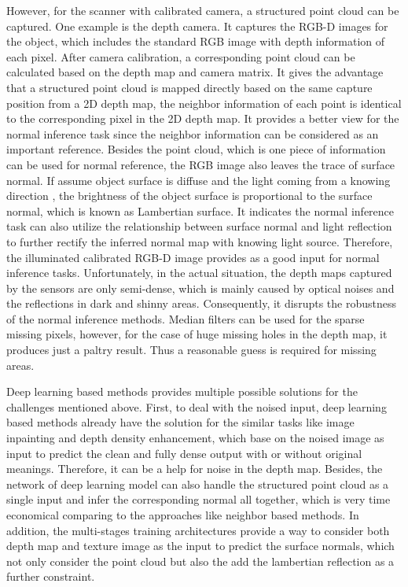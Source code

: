 However, for the scanner with calibrated camera, a structured point cloud can be captured. One example is the depth camera. It captures the RGB-D images for the object, which includes the standard RGB image with depth information of each pixel. After camera calibration, a corresponding point cloud can be calculated based on the depth map and camera matrix. It gives the advantage that a structured point cloud is mapped directly based on the same capture position from a 2D depth map, the neighbor information of each point is identical to the corresponding pixel in the 2D depth map. It provides a better view for the normal inference task since the neighbor information can be considered as an important reference.
Besides the point cloud, which is one piece of information can be used for normal reference, the RGB image also leaves the trace of surface normal. If assume object surface is diffuse and the light coming from a knowing direction , the brightness of the object surface is proportional to the surface normal, which is known as Lambertian surface. It indicates the normal inference task can also utilize the relationship between surface normal and light reflection to further rectify the inferred normal map with knowing light source. Therefore, the illuminated calibrated RGB-D image provides as a good input for normal inference tasks.
Unfortunately, in the actual situation, the depth maps captured by the sensors are only semi-dense, which is mainly caused by optical noises and the reflections in dark and shinny areas. Consequently, it disrupts the robustness of the normal inference methods. Median filters can be used for the sparse missing pixels, however, for the case of huge missing holes in the depth map, it produces just a paltry result. Thus a reasonable guess is required for missing areas.

Deep learning based methods provides multiple possible solutions for the challenges mentioned above. First, to deal with the noised input, deep learning based methods already have the solution for the similar tasks like image inpainting and depth density enhancement, which base on the noised image as input to predict the clean and fully dense output with or without original meanings. Therefore, it can be a help for noise in the depth map. Besides, the network of deep learning model can also handle the structured point cloud as a single input and infer the corresponding normal all together, which is very time economical comparing to the approaches like neighbor based methods. In addition, the multi-stages training architectures provide a way to consider both depth map and texture image as the input to predict the surface normals, which not only consider the point cloud but also the add the lambertian reflection as a further constraint.

